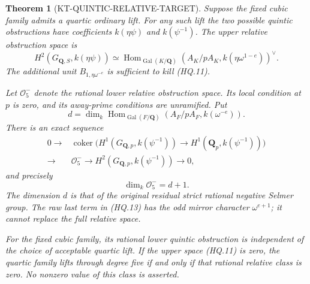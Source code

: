 \documentclass[11pt,a4paper]{article}
\newtheorem{theorem}{Theorem}[section]
\theoremstyle{definition}
\begin{document}
\begin{theorem}[KT-QUINTIC-RELATIVE-TARGET]
Suppose the fixed cubic family admits a quartic ordinary lift.
For any such lift the two possible quintic obstructions have
coefficients \(k(\eta\psi)\) and \(k(\psi^{-1})\).
The upper relative obstruction space is
\[
 H^2(G_{\mathbf Q,S},k(\eta\psi))
 \simeq\operatorname{Hom}_{\operatorname{Gal}(K/\mathbf Q)}
       (A_K/pA_K,k(\eta\omega^{1-e}))^\vee.
                                                        \tag{HQ.11}
\]
The additional unit \(B_{1,\eta\omega^{-e}}\) is
sufficient to kill (HQ.11).

Let \(\mathcal O^-_5\) denote the rational lower
relative obstruction space.  Its local condition at
\(p\) is zero, and its away-prime conditions are
unramified.  Put
\[
 d=\dim_k\operatorname{Hom}_{\operatorname{Gal}(F/\mathbf Q)}
                       (A_F/pA_F,k(\omega^{-e})).
                                                        \tag{HQ.12}
\]
There is an exact sequence
\[
\begin{split}
0\longrightarrow&
 \operatorname{coker}\bigl(H^1(G_{\mathbf Q,p},k(\psi^{-1}))
                  \to H^1(\mathbf Q_p,k(\psi^{-1}))\bigr)\\
\longrightarrow&\mathcal O^-_5
\longrightarrow H^2(G_{\mathbf Q,p},k(\psi^{-1}))
\longrightarrow0,
\end{split}                                               \tag{HQ.13}
\]
and precisely
\[
                         \dim_k\mathcal O^-_5=d+1.
                                                        \tag{HQ.14}
\]
The dimension \(d\) is that of the original residual
strict rational negative Selmer group.  The raw last
term in (HQ.13) has the odd mirror character
\(\omega^{e+1}\); it cannot replace the full relative
space.

For the fixed cubic family, its rational lower
quintic obstruction is independent of the choice
of acceptable quartic lift.  If the upper space
(HQ.11) is zero, the quartic family lifts through
degree five if and only if that rational relative
class is zero.  No nonzero value of this class is
asserted.
\end{theorem}
\end{document}
